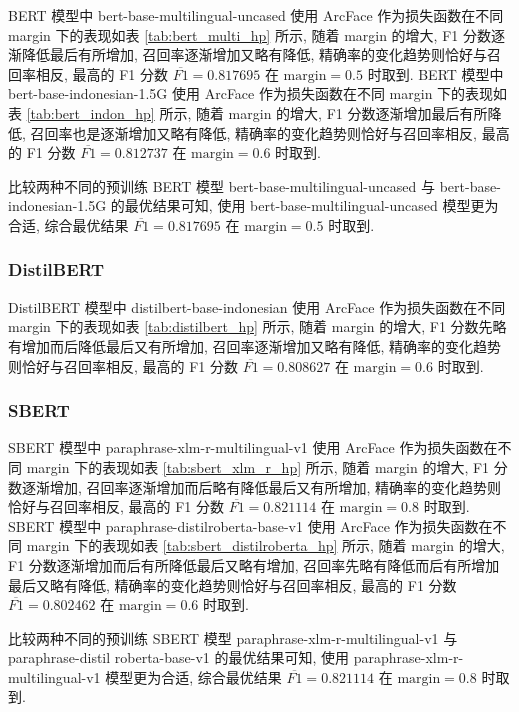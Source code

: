 \documentclass[12pt]{article}
\begin{document}
BERT 模型中 bert-base-multilingual-uncased 使用 ArcFace 作为损失函数在不同 margin 下的表现如表 \ref{tab:bert_multi_hp} 所示, 随着 margin 的增大, F1 分数逐渐降低最后有所增加, 召回率逐渐增加又略有降低, 精确率的变化趋势则恰好与召回率相反, 最高的 F1 分数 $\overline{F1}=0.817695$ 在 $\text{margin} = 0.5$ 时取到. BERT 模型中 bert-base-indonesian-1.5G 使用 ArcFace 作为损失函数在不同 margin 下的表现如表 \ref{tab:bert_indon_hp} 所示, 随着 margin 的增大, F1 分数逐渐增加最后有所降低, 召回率也是逐渐增加又略有降低, 精确率的变化趋势则恰好与召回率相反, 最高的 F1 分数 $\overline{F1}=0.812737$ 在 $\text{margin} = 0.6$ 时取到.

比较两种不同的预训练 BERT 模型 bert-base-multilingual-uncased 与 bert-base-indonesian-1.5G 的最优结果可知, 使用 bert-base-multilingual-uncased 模型更为合适, 综合最优结果 $\overline{F1}=0.817695$ 在 $\text{margin} = 0.5$ 时取到.

\subsubsection{DistilBERT}

DistilBERT 模型中 distilbert-base-indonesian 使用 ArcFace 作为损失函数在不同 margin 下的表现如表 \ref{tab:distilbert_hp} 所示, 随着 margin 的增大, F1 分数先略有增加而后降低最后又有所增加, 召回率逐渐增加又略有降低, 精确率的变化趋势则恰好与召回率相反, 最高的 F1 分数 $\overline{F1}=0.808627$ 在 $\text{margin} = 0.6$ 时取到.

\subsubsection{SBERT}

SBERT 模型中 paraphrase-xlm-r-multilingual-v1 使用 ArcFace 作为损失函数在不同 margin 下的表现如表 \ref{tab:sbert_xlm_r_hp} 所示, 随着 margin 的增大, F1 分数逐渐增加, 召回率逐渐增加而后略有降低最后又有所增加, 精确率的变化趋势则恰好与召回率相反, 最高的 F1 分数 $\overline{F1}=0.821114$ 在 $\text{margin} = 0.8$ 时取到. SBERT 模型中 paraphrase-distilroberta-base-v1 使用 ArcFace 作为损失函数在不同 margin 下的表现如表 \ref{tab:sbert_distilroberta_hp} 所示, 随着 margin 的增大, F1 分数逐渐增加而后有所降低最后又略有增加, 召回率先略有降低而后有所增加最后又略有降低, 精确率的变化趋势则恰好与召回率相反, 最高的 F1 分数 $\overline{F1}=0.802462$ 在 $\text{margin} = 0.6$ 时取到.

比较两种不同的预训练 SBERT 模型 paraphrase-xlm-r-multilingual-v1 与 paraphrase-distil roberta-base-v1 的最优结果可知, 使用 paraphrase-xlm-r-multilingual-v1 模型更为合适, 综合最优结果 $\overline{F1}=0.821114$ 在 $\text{margin} = 0.8$ 时取到.
\end{document}
